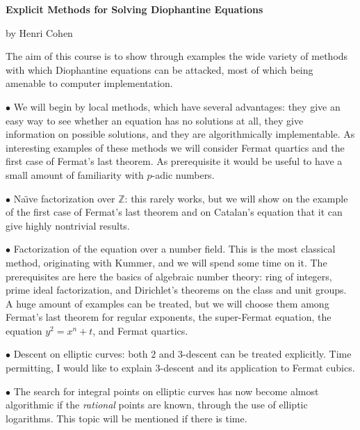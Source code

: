 \documentclass[12pt]{article}
\newcommand{\Z}{{\mathbb Z}}
\begin{document}
\pagestyle{plain}

\centerline{\large\bf Explicit Methods for Solving Diophantine Equations}

\vskip1cm

\centerline{by Henri Cohen}

\vskip2cm

The aim of this course is to show through examples the wide variety of methods
with which Diophantine equations can be attacked, most of which being amenable
to computer implementation.

\smallskip

$\bullet$ We will begin by local methods, which have several advantages: they
give an easy way to see whether an equation has no solutions at all, they give
information on possible solutions, and they are algorithmically implementable.
As interesting examples of these methods we will consider Fermat quartics and
the first case of Fermat's last theorem. As prerequisite it would be useful to
have a small amount of familiarity with $p$-adic numbers.

\smallskip

$\bullet$ Na\"\i ve factorization over $\Z$: this rarely works, but we will
show on the example of the first case of Fermat's last theorem and on Catalan's
equation that it can give highly nontrivial results.

\smallskip

$\bullet$ Factorization of the equation over a number field. This is the most
classical method, originating with Kummer, and we will spend some time on
it. The prerequisites are here the basics of algebraic number theory: ring
of integers, prime ideal factorization, and Dirichlet's theorems on the
class and unit groups. A huge amount of examples can be treated, but we will
choose them among Fermat's last theorem for regular exponents, the 
super-Fermat equation, the equation $y^2=x^n+t$, and Fermat quartics.

\smallskip

$\bullet$ Descent on elliptic curves: both $2$ and $3$-descent can be treated
explicitly. Time permitting, I would like to explain $3$-descent and its
application to Fermat cubics.

\smallskip

$\bullet$ The search for integral points on elliptic curves has now become
almost algorithmic if the \emph{rational} points are known, through the use
of elliptic logarithms. This topic will be mentioned if there is time.
\end{document}
